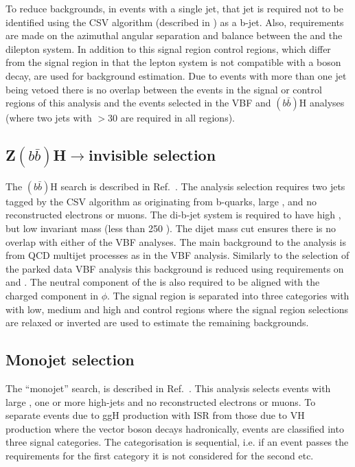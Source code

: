 To reduce backgrounds, in events with a single jet, that jet is required not to be identified using the \ac{CSV} algorithm (described in ) as a b-jet. Also, requirements are made on the azimuthal angular separation and \pt balance between the \MET and the dilepton system. In addition to this signal region control regions, which differ from the signal region in that the lepton system is not compatible with a \PZ boson decay, are used for background estimation. Due to events with more than one jet being vetoed there is no overlap between the events in the signal or control regions of this analysis and the events selected in the \ac{VBF} and \PZ$(b\bar{b})$H analyses (where two jets with \pt$>30$ \GeV are required in all regions). 

\subsection{Z$(b\bar{b})$H$\rightarrow$invisible selection}
\label{sec:zbbh}
The \PZ$(b\bar{b})$H search is described in Ref.~\cite{CMS-PAS-HIG-13-028}. The analysis selection requires two jets tagged by the \ac{CSV} algorithm as originating from b-quarks, large \MET, and no reconstructed electrons or muons. The di-b-jet system is required to have high \pt, but low invariant mass (less than 250 \GeV). The dijet mass cut ensures there is no overlap with either of the \ac{VBF} analyses. The main background to the analysis is from \ac{QCD} multijet processes as in the \ac{VBF} analysis. Similarly to the selection of the parked data \ac{VBF} analysis this background is reduced using requirements on \jetmetdphi and \METsig. The neutral component of the \MET is also required to be aligned with the charged component in $\phi$. The signal region is separated into three categories with with low, medium and high \MET and control regions where the signal region selections are relaxed or inverted are used to estimate the remaining backgrounds.

\subsection{Monojet selection}
\label{sec:monojet}
The ``monojet'' search, is described in Ref.~\cite{CMS-PAS-EXO-12-055}. This analysis selects events with large \MET, one or more high-\pt jets and no reconstructed electrons or muons. To separate events due to \ac{ggH} production with \ac{ISR} from those due to \ac{VH} production where the vector boson decays hadronically, events are classified into three signal categories. The categorisation is sequential, i.e. if an event passes the requirements for the first category it is not considered for the second etc. 

